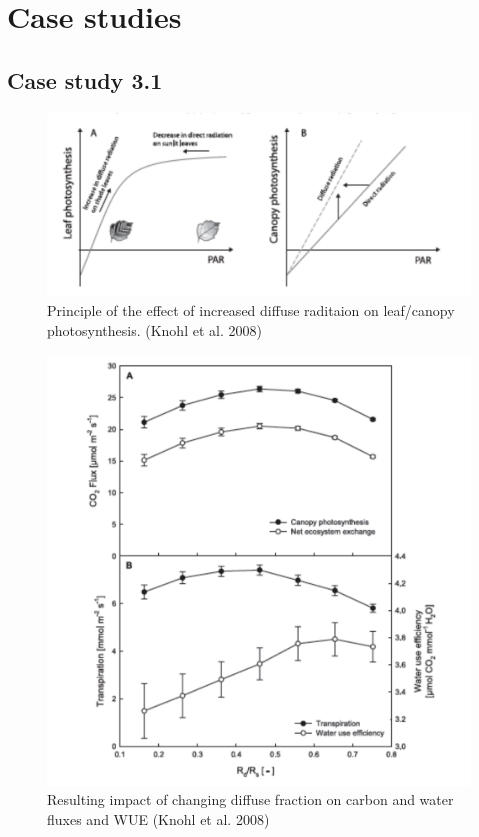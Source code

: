 \documentclass[
  oneside]{book}
\begin{document}
\hypertarget{case-studies-1}{%
\section{Case studies}\label{case-studies-1}}

\hypertarget{case-study-3.1}{%
\subsection{Case study 3.1}\label{case-study-3.1}}

\begin{figure}

{\centering \includegraphics[width=0.8\linewidth]{figures/chap3/f332_knohl1} 

}

\caption{Principle of the effect of increased diffuse raditaion on leaf/canopy photosynthesis. (Knohl et al. 2008)}\label{fig:f332}
\end{figure}

\begin{figure}

{\centering \includegraphics[width=0.8\linewidth]{figures/chap3/f333_knohl2} 

}

\caption{Resulting impact of changing diffuse fraction on carbon and water fluxes and WUE (Knohl et al. 2008)}\label{fig:f333}
\end{figure}
\end{document}
